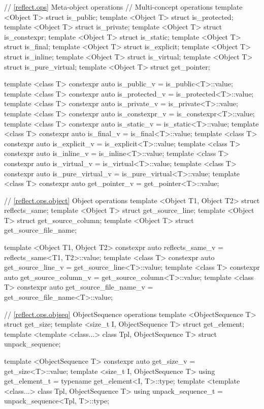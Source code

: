 \begin{std.txt}
\begin{codeblock}
{{// \ref{reflect.ops} Meta-object operations
// Multi-concept operations
template <Object T> struct is_public;
template <Object T> struct is_protected;
template <Object T> struct is_private;
template <Object T> struct is_constexpr;
template <Object T> struct is_static;
template <Object T> struct is_final;
template <Object T> struct is_explicit;
template <Object T> struct is_inline;
template <Object T> struct is_virtual;
template <Object T> struct is_pure_virtual;
template <Object T> struct get_pointer;

template <class T>
  constexpr auto is_public_v = is_public<T>::value;
template <class T>
  constexpr auto is_protected_v = is_protected<T>::value;
template <class T>
  constexpr auto is_private_v = is_private<T>::value;
template <class T>
   constexpr auto is_constexpr_v = is_constexpr<T>::value;
template <class T>
   constexpr auto is_static_v = is_static<T>::value;
template <class T>
   constexpr auto is_final_v = is_final<T>::value;
template <class T>
   constexpr auto is_explicit_v = is_explicit<T>::value;
template <class T>
   constexpr auto is_inline_v = is_inline<T>::value;
template <class T>
   constexpr auto is_virtual_v = is_virtual<T>::value;
template <class T>
   constexpr auto is_pure_virtual_v = is_pure_virtual<T>::value;
template <class T>
   constexpr auto get_pointer_v = get_pointer<T>::value;

// \ref{reflect.ops.object} Object operations
template <Object T1, Object T2> struct reflects_same;
template <Object T> struct get_source_line;
template <Object T> struct get_source_column;
template <Object T> struct get_source_file_name;

template <Object T1, Object T2>
  constexpr auto reflects_same_v = reflects_same<T1, T2>::value;
template <class T>
  constexpr auto get_source_line_v = get_source_line<T>::value;
template <class T>
  constexpr auto get_source_column_v = get_source_column<T>::value;
template <class T>
  constexpr auto get_source_file_name_v = get_source_file_name<T>::value;

// \ref{reflect.ops.objseq} ObjectSequence operations
template <ObjectSequence T> struct get_size;
template <size_t I, ObjectSequence T> struct get_element;
template <template <class...> class Tpl, ObjectSequence T>
  struct unpack_sequence;

template <ObjectSequence T>
  constexpr auto get_size_v = get_size<T>::value;
template <size_t I, ObjectSequence T>
  using get_element_t = typename get_element<I, T>::type;
template <template <class...> class Tpl, ObjectSequence T>
  using unpack_sequence_t = unpack_sequence<Tpl, T>::type;

}}
\end{codeblock}
\end{std.txt}
